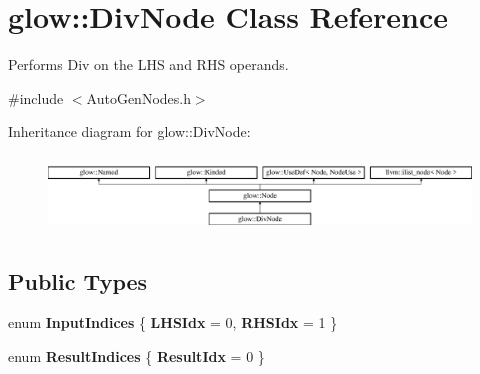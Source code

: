 \hypertarget{classglow_1_1_div_node}{}\section{glow\+:\+:Div\+Node Class Reference}
\label{classglow_1_1_div_node}


Performs Div on the L\+HS and R\+HS operands.  




{\ttfamily \#include $<$Auto\+Gen\+Nodes.\+h$>$}

Inheritance diagram for glow\+:\+:Div\+Node\+:\begin{figure}[H]
\begin{center}
\leavevmode
\includegraphics[height=2.028986cm]{classglow_1_1_div_node}
\end{center}
\end{figure}
\subsection*{Public Types}
\begin{DoxyCompactItemize}
\item 
\mbox{\label{classglow_1_1_div_node_a7221e536157d001c91c9be135bf8196d}} 
enum {\bfseries Input\+Indices} \{ {\bfseries L\+H\+S\+Idx} = 0, 
{\bfseries R\+H\+S\+Idx} = 1
 \}
\item 
\mbox{\label{classglow_1_1_div_node_a60f73c243233e8c5378d15cb38a2036d}} 
enum {\bfseries Result\+Indices} \{ {\bfseries Result\+Idx} = 0
 \}
\end{DoxyCompactItemize}
